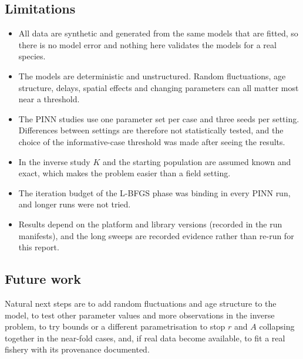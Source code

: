 \subsection{Limitations}
\begin{itemize}
\item All data are synthetic and generated from the same models that are fitted, so there is no model error and nothing here validates the models for a real species.
\item The models are deterministic and unstructured. Random fluctuations, age structure, delays, spatial effects and changing parameters can all matter most near a threshold.
\item The PINN studies use one parameter set per case and three seeds per setting. Differences between settings are therefore not statistically tested, and the choice of the informative-case threshold was made after seeing the results.
\item In the inverse study $K$ and the starting population are assumed known and exact, which makes the problem easier than a field setting.
\item The iteration budget of the L-BFGS phase was binding in every PINN run, and longer runs were not tried.
\item Results depend on the platform and library versions (recorded in the run manifests), and the long sweeps are recorded evidence rather than re-run for this report.
\end{itemize}

\subsection{Future work}
Natural next steps are to add random fluctuations and age structure to the model, to test other parameter values and more observations in the inverse problem, to try bounds or a different parametrisation to stop $r$ and $A$ collapsing together in the near-fold cases, and, if real data become available, to fit a real fishery with its provenance documented.